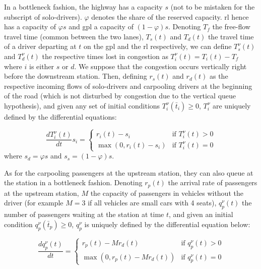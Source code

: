 \documentclass[english, a4paper]{article}
\theoremstyle{plain}
\theoremstyle{definition}
\theoremstyle{remark}
\begin{document}
In a bottleneck fashion, the highway has a capacity $s$ (not to be mistaken for the subscript of solo-drivers). $\varphi$ denotes the share of the reserved capacity. \acrshort{rl} hence has a capacity of $\varphi s$ and \acrshort{gpl} a capacity of $(1-\varphi)s$. Denoting $T_f$ the free-flow travel time (common between the two lanes), $T_s(t)$ and $T_d(t)$ the travel time of a driver departing at $t$ on the \acrshort{gpl} and the \acrshort{rl} respectively, we can define $T^{\nu}_s(t)$ and $T^{\nu}_d(t)$ the respective times lost in congestion as $T^{\nu}_i(t) = T_i(t) - T_f$ where $i$ is either $s$ or $d$. We suppose that the congestion occurs vertically right before the downstream station. Then, defining $r_s (t)$ and $r_d (t)$ as the respective incoming flows of solo-drivers and carpooling drivers at the beginning of the road (which is not disturbed by congestion due to the vertical queue hypothesis), and given any set of initial conditions $T^{\nu}_i(\bar{t}_i) \geq 0$, $T^{\nu}_i$ are uniquely defined by the differential equations:

\begin{equation}
    \frac{d T^{\nu}_i(t)}{dt} s_i = \left\{
    \begin{array}{lr}
        r_i (t) - s_i & \text{if } T^{\nu}_i(t) > 0\\
        \max (0, r_i (t) - s_i) & \text{if } T^{\nu}_i(t) = 0
    \end{array}
    \right.
\end{equation}
where $s_d = \varphi s$ and $s_s = (1-\varphi)s$.

As for the carpooling passengers at the upstream station, they can also queue at the station in a bottleneck fashion. Denoting $r_p(t)$ the arrival rate of passengers at the upstream station, $M$ the capacity of passengers in vehicles without the driver (for example $M=3$ if all vehicles are small cars with 4 seats), $q^{\nu}_p(t)$ the number of passengers waiting at the station at time $t$, and given an initial condition $q^{\nu}_p(\bar{t}_p) \geq 0$, $q^{\nu}_p$ is uniquely defined by the differential equation below:

\begin{equation}
    \label{eq_queue_at_station}
    \frac{d q^{\nu}_p(t)}{dt} = \left\{
    \begin{array}{lr}
        r_p (t) - M r_d (t) & \text{if } q^{\nu}_p(t) > 0\\
        \max (0, r_p (t) - M r_d (t)) & \text{if } q^{\nu}_p(t) = 0
    \end{array}
    \right.
\end{equation}
\end{document}
